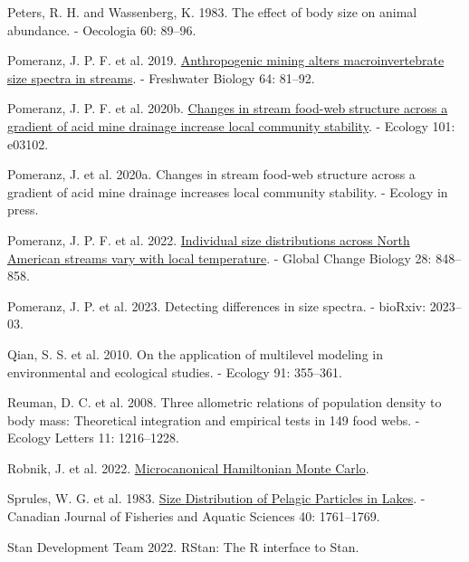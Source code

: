 \documentclass[
  12pt,
]{article}
\newlength{\cslhangindent}
\newlength{\cslentryspacingunit} %
\newenvironment{CSLReferences}[2] %
 {%
  \setlength{\parindent}{0pt}
  \ifodd #1
  \let\oldpar\par
  \def\par{\hangindent=\cslhangindent\oldpar}
  \fi
  \setlength{\parskip}{#2\cslentryspacingunit}
 }%
 {}
\begin{document}
\begin{CSLReferences}{1}{0}
\leavevmode{}%
Peters, R. H. and Wassenberg, K. 1983. The effect of body size on animal
abundance. - Oecologia 60: 89--96.

\leavevmode{}%
Pomeranz, J. P. F. et al. 2019.
\href{https://doi.org/10.1111/fwb.13196}{Anthropogenic mining alters
macroinvertebrate size spectra in streams}. - Freshwater Biology 64:
81--92.

\leavevmode{}%
Pomeranz, J. P. F. et al. 2020b.
\href{https://doi.org/10.1002/ecy.3102}{Changes in stream food-web
structure across a gradient of acid mine drainage increase local
community stability}. - Ecology 101: e03102.

\leavevmode{}%
Pomeranz, J. et al. 2020a. Changes in stream food-web structure across a
gradient of acid mine drainage increases local community stability. -
Ecology in press.

\leavevmode{}%
Pomeranz, J. P. F. et al. 2022.
\href{https://doi.org/10.1111/gcb.15862}{Individual size distributions
across {North American} streams vary with local temperature}. - Global
Change Biology 28: 848--858.

\leavevmode{}%
Pomeranz, J. P. et al. 2023. Detecting differences in size spectra. -
bioRxiv: 2023--03.

\leavevmode{}%
Qian, S. S. et al. 2010. On the application of multilevel modeling in
environmental and ecological studies. - Ecology 91: 355--361.

\leavevmode{}%
Reuman, D. C. et al. 2008. Three allometric relations of population
density to body mass: Theoretical integration and empirical tests in 149
food webs. - Ecology Letters 11: 1216--1228.

\leavevmode{}%
Robnik, J. et al. 2022.
\href{https://doi.org/10.48550/arXiv.2212.08549}{Microcanonical
{Hamiltonian Monte Carlo}}.

\leavevmode{}%
Sprules, W. G. et al. 1983. \href{https://doi.org/10.1139/f83-205}{Size
{Distribution} of {Pelagic Particles} in {Lakes}}. - Canadian Journal of
Fisheries and Aquatic Sciences 40: 1761--1769.

\leavevmode{}%
Stan Development Team 2022. {RStan}: The {R} interface to {Stan}.


\end{CSLReferences}
\end{document}
